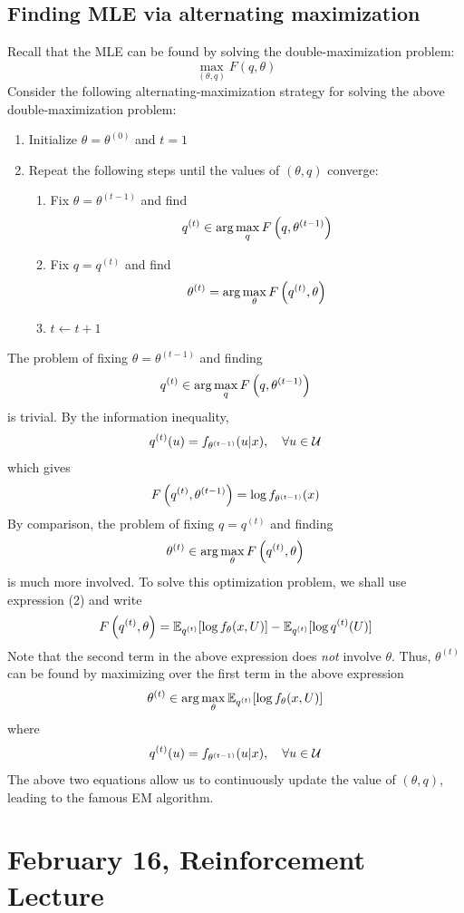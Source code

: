\documentclass[11pt]{book}
\begin{document}
\section{Finding MLE via alternating maximization}
Recall that the MLE can be found by solving the double-maximization problem: 
\[
  \max_{(\theta, q)} F(q, \theta) 
\]
Consider the following alternating-maximization strategy for solving the above double-maximization problem: 
\begin{enumerate}
  \item Initialize $\theta = \theta^{(0)}$ and $t=1$
  \item Repeat the following steps until the values of $(\theta, q)$ converge:
    \begin{enumerate}
      \item Fix $\theta = \theta^{(t-1)}$ and find 
        \[
          q^{(t)} \in \arg\max_{q}F\left( q,\theta^{(t-1)} \right)
        \] 
      \item Fix $q = q^{(t)}$ and find
        \[
          \theta^{(t)} = \arg\max_{\theta}F\left( q^{(t)}, \theta \right)
        \]
      \item $t \leftarrow t + 1$
    \end{enumerate}
\end{enumerate}
The problem of fixing $\theta = \theta^{(t-1)}$ and finding 
\[
  q^{(t)} \in \arg\max_{q}F\left( q,\theta^{(t-1)} \right)
\] 
is trivial. By the information inequality, 
\[
  q^{(t)}(u) = f_{\theta^{(t-1)}} (u|x),\quad\forall u\in\mathcal{U} 
\] 
which gives 
\[
  F\left( q^{(t)}, \theta^{(t-1)} \right) = \log f_{\theta^{(t-1)}}(x)
\]
By comparison, the problem of fixing $q=q^{(t)}$ and finding 
\[
  \theta^{(t)} \in \arg\max_{\theta}F\left( q^{(t)},\theta \right) 
\]  
is much more involved. To solve this optimization problem, we shall use expression (2) and write %
\[
  F\left( q^{(t)}, \theta \right) = \mathbb{E}_{q^{(t)}} [ \log f_\theta(x, U)] - \mathbb{E}_{q^{(t)}} [\log q^{(t)}(U)]
\]
Note that the second term in the above expression does \textit{not} involve $\theta$. Thus, $\theta^{(t)}$ can be found by maximizing
over the first term in the above expression 
\[
  \theta^{(t)} \in \arg\max_{\theta} \mathbb{E}_{q^{(t)}} [\log f_\theta(x, U)] 
\] 
where 
\[
  q^{(t)} (u) = f_{\theta^{(t-1)}} (u | x), \quad\forall u\in\mathcal{U} 
\]
The above two equations allow us to continuously update the value of $(\theta, q)$, leading to the famous EM algorithm.

\chapter{February 16, Reinforcement Lecture}
\end{document}
